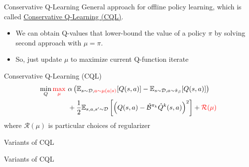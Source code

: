 \documentclass[11pt]{beamer}
\newcommand{\mbb}[1]{\mathbb{#1}}
\newcommand{\mc}[1]{\mathcal{#1}}
\begin{document}
\begin{frame}{Conservative Q-Learning}
  General approach for offline policy learning, which is called \underline{Conservative Q-Learning (CQL)}.
  \begin{itemize}
    \item We can obtain Q-values that lower-bound the value of a policy $\pi$ by solving second approach with $\mu = \pi$.
    \item So, just update $\mu$ to maximize current Q-function iterate
  \end{itemize}
  \begin{block}{Conservative Q-Learning (CQL)}
    \[
    \begin{aligned}
      \min_{Q} \textcolor{red}{\max_{\mu}} \ &\alpha \left( \mbb{E}_{s \sim \mc{D}, \textcolor{red}{a \sim \mu(a|s)}}[Q(s,a)] - \mbb{E}_{s \sim \mc{D}, a \sim \hat{\pi}_\beta} [Q(s,a)] \right) \\
      &+ \frac{1}{2} \mbb{E}_{s,a,s^\prime \sim \mc{D}}\left[\left(Q(s,a) - \hat{\mc{B}}^{\pi_k}\hat{Q}^k (s,a) \right)^2 \right] + \textcolor{red}{\mc{R}(\mu)}
    \end{aligned}
    \]
    where $\mc{R}(\mu)$ is particular choices of regularizer
  \end{block}
\end{frame}

\begin{frame}{Variants of CQL}
  \begin{block}{Variants of CQL}
    
  \end{block}
\end{frame}
\end{document}
